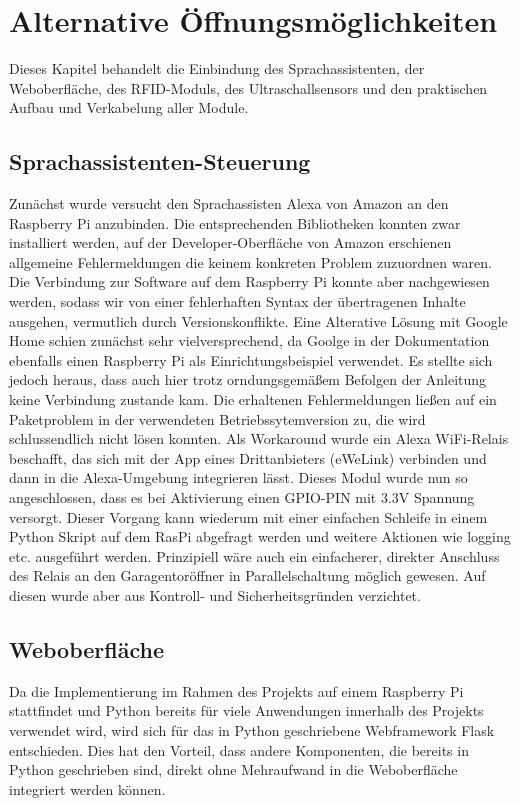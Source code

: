 \chapter{Alternative Öffnungsmöglichkeiten}
Dieses Kapitel behandelt die Einbindung des Sprachassistenten, der Weboberfläche, des RFID-Moduls, des Ultraschallsensors und den praktischen Aufbau und Verkabelung aller Module.

\section{Sprachassistenten-Steuerung}
Zunächst wurde versucht den Sprachassisten Alexa von Amazon an den Raspberry Pi anzubinden. Die entsprechenden Bibliotheken konnten zwar installiert werden, auf der Developer-Oberfläche von Amazon erschienen allgemeine Fehlermeldungen die keinem konkreten Problem zuzuordnen waren. Die Verbindung zur Software auf dem Raspberry Pi konnte aber nachgewiesen werden, sodass wir von einer fehlerhaften Syntax der übertragenen Inhalte ausgehen, vermutlich durch Versionskonflikte.
Eine Alterative Lösung mit Google Home schien zunächst sehr vielversprechend, da Goolge in der Dokumentation ebenfalls einen Raspberry Pi als Einrichtungsbeispiel verwendet. Es stellte sich jedoch heraus, dass auch hier trotz orndungsgemäßem Befolgen der Anleitung keine Verbindung zustande kam. Die erhaltenen Fehlermeldungen ließen auf ein Paketproblem in der verwendeten Betriebssytemversion zu, die wird schlussendlich nicht lösen konnten. %
Als Workaround wurde ein Alexa WiFi-Relais beschafft, das sich mit der App eines Drittanbieters (eWeLink) verbinden und dann in die Alexa-Umgebung integrieren lässt. Dieses Modul wurde nun so angeschlossen, dass es bei Aktivierung einen \ac{GPIO}-PIN mit 3.3V Spannung versorgt. Dieser Vorgang kann wiederum mit einer einfachen Schleife in einem Python Skript auf dem RasPi abgefragt werden und weitere Aktionen wie logging etc. ausgeführt werden. Prinzipiell wäre auch ein einfacherer, direkter Anschluss des Relais an den Garagentoröffner in Parallelschaltung möglich gewesen. Auf diesen wurde aber aus Kontroll- und Sicherheitsgründen verzichtet.

\section{Weboberfläche}
Da die Implementierung im Rahmen des Projekts auf einem Raspberry Pi stattfindet und Python bereits für viele Anwendungen innerhalb des Projekts verwendet wird, wird sich für das in Python geschriebene Webframework Flask entschieden. Dies hat den Vorteil, dass andere Komponenten, die bereits in Python geschrieben sind, direkt ohne Mehraufwand in die Weboberfläche integriert werden können.

